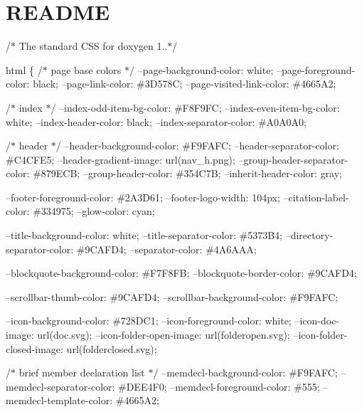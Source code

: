 \chapter{README}
\hypertarget{md__r_e_a_d_m_e}{}\label{md__r_e_a_d_m_e}
/\texorpdfstring{$\ast$}{*} The standard CSS for doxygen 1..\texorpdfstring{$\ast$}{*}/

html \{ /\texorpdfstring{$\ast$}{*} page base colors \texorpdfstring{$\ast$}{*}/ --page-\/background-\/color\+: white; --page-\/foreground-\/color\+: black; --page-\/link-\/color\+: \#3D578C; --page-\/visited-\/link-\/color\+: \#4665A2;

/\texorpdfstring{$\ast$}{*} index \texorpdfstring{$\ast$}{*}/ --index-\/odd-\/item-\/bg-\/color\+: \#\+F8\+F9\+FC; --index-\/even-\/item-\/bg-\/color\+: white; --index-\/header-\/color\+: black; --index-\/separator-\/color\+: \#\+A0\+A0\+A0;

/\texorpdfstring{$\ast$}{*} header \texorpdfstring{$\ast$}{*}/ --header-\/background-\/color\+: \#\+F9\+FAFC; --header-\/separator-\/color\+: \#\+C4\+CFE5; --header-\/gradient-\/image\+: url(\textquotesingle{}nav\+\_\+h.\+png\textquotesingle{}); --group-\/header-\/separator-\/color\+: \#879ECB; --group-\/header-\/color\+: \#354C7B; --inherit-\/header-\/color\+: gray;

--footer-\/foreground-\/color\+: \#2A3\+D61; --footer-\/logo-\/width\+: 104px; --citation-\/label-\/color\+: \#334975; --glow-\/color\+: cyan;

--title-\/background-\/color\+: white; --title-\/separator-\/color\+: \#5373B4; --directory-\/separator-\/color\+: \#9CAFD4; --separator-\/color\+: \#4A6\+AAA;

--blockquote-\/background-\/color\+: \#\+F7\+F8\+FB; --blockquote-\/border-\/color\+: \#9CAFD4;

--scrollbar-\/thumb-\/color\+: \#9CAFD4; --scrollbar-\/background-\/color\+: \#\+F9\+FAFC;

--icon-\/background-\/color\+: \#728DC1; --icon-\/foreground-\/color\+: white; --icon-\/doc-\/image\+: url(\textquotesingle{}doc.\+svg\textquotesingle{}); --icon-\/folder-\/open-\/image\+: url(\textquotesingle{}folderopen.\+svg\textquotesingle{}); --icon-\/folder-\/closed-\/image\+: url(\textquotesingle{}folderclosed.\+svg\textquotesingle{});

/\texorpdfstring{$\ast$}{*} brief member declaration list \texorpdfstring{$\ast$}{*}/ --memdecl-\/background-\/color\+: \#\+F9\+FAFC; --memdecl-\/separator-\/color\+: \#\+DEE4\+F0; --memdecl-\/foreground-\/color\+: \#555; --memdecl-\/template-\/color\+: \#4665A2;

